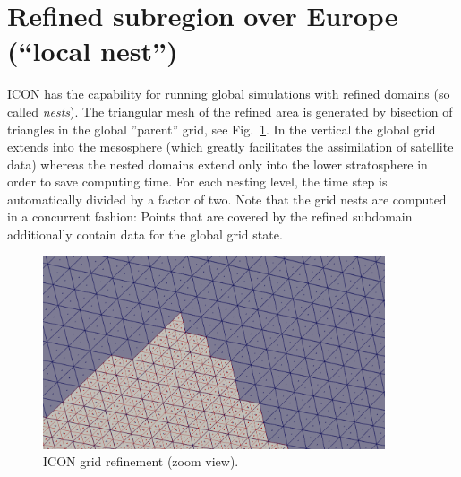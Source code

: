 \section{Refined subregion over Europe (``local nest'')}

ICON has the capability for running global simulations with refined
domains (so called \emph{nests}).
%
The triangular mesh of the refined area is generated by bisection of
triangles in the global ''parent'' grid, see
Fig.~\ref{fig:icon_grid_refinement_zoom_view}.
In the vertical the global grid extends into the mesosphere (which
greatly facilitates the assimilation of satellite data) whereas the
nested domains extend only into the lower stratosphere in order to
save computing time.
For each nesting level, the time step is automatically divided by a
factor of two.
%
Note that the grid nests are computed in a concurrent fashion:  Points
that are covered by the refined subdomain additionally contain data
for the global grid state.

\begin{figure}[h]
  \centering
  \includegraphics[width=0.90\textwidth]{pics/grid_refinement.png}
  \caption{ICON grid refinement (zoom view).}
  \label{fig:icon_grid_refinement_zoom_view}
\end{figure}



%  




